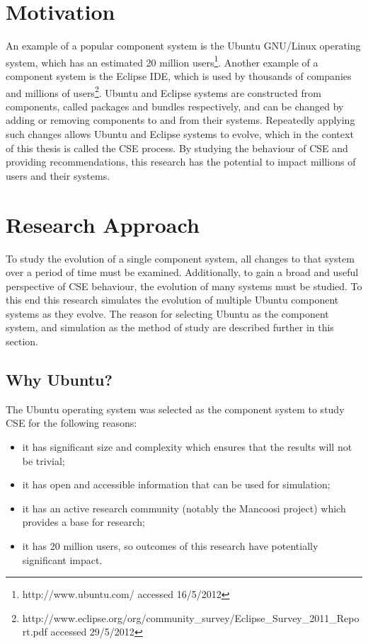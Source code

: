 \section{Motivation}
An example of a popular component system is the Ubuntu GNU/Linux operating system, which has an estimated 20 million users\footnote{http://www.ubuntu.com/ accessed 16/5/2012}. 
Another example of a component system is the Eclipse IDE, which is used by thousands of companies and millions of users\footnote{http://www.eclipse.org/org/community\_survey/Eclipse\_Survey\_2011\_Report.pdf  accessed 29/5/2012}.
Ubuntu and Eclipse systems are constructed from components, called packages and bundles respectively, 
and can be changed by adding or removing components to and from their systems.
Repeatedly applying such changes allows Ubuntu and Eclipse systems to evolve, which in the context of this thesis is called the CSE process.
By studying the behaviour of CSE and providing recommendations, this research has the potential to impact millions of users and their systems.

\section{Research Approach}
To study the evolution of a single component system, all changes to that system over a period of time must be examined.
Additionally, to gain a broad and useful perspective of CSE behaviour, the evolution of many systems must be studied.
To this end this research simulates the evolution of multiple Ubuntu component systems as they evolve.
The reason for selecting Ubuntu as the component system, and simulation as the method of study are described further in this section.

\subsection{Why Ubuntu?}
The Ubuntu operating system was selected as the component system to study CSE for the following reasons:
\begin{itemize}
  \item it has significant size and complexity which ensures that the results will not be trivial;
  \item it has open and accessible information that can be used for simulation;
  \item it has an active research community (notably the Mancoosi project) which provides a base for research;
  \item it has 20 million users, so outcomes of this research have potentially significant impact.
\end{itemize} 

